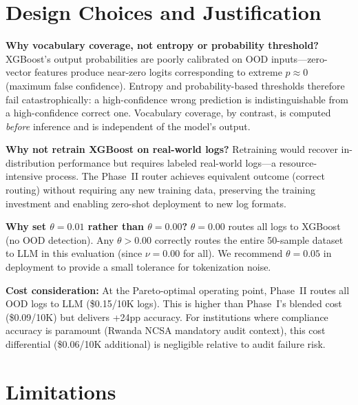 \documentclass[11pt,conference]{IEEEtran}
\begin{document}
\section{Design Choices and Justification}

\textbf{Why vocabulary coverage, not entropy or probability threshold?}
XGBoost's output probabilities are poorly calibrated on OOD inputs---zero-vector
features produce near-zero logits corresponding to extreme $p \approx 0$
(maximum false confidence). Entropy and probability-based thresholds therefore
fail catastrophically: a high-confidence wrong prediction is indistinguishable
from a high-confidence correct one. Vocabulary coverage, by contrast, is
computed \emph{before} inference and is independent of the model's output.

\textbf{Why not retrain XGBoost on real-world logs?}
Retraining would recover in-distribution performance but requires labeled
real-world logs---a resource-intensive process. The Phase~II router achieves
equivalent outcome (correct routing) without requiring any new training data,
preserving the training investment and enabling zero-shot deployment to new
log formats.

\textbf{Why set $\theta = 0.01$ rather than $\theta = 0.00$?}
$\theta = 0.00$ routes all logs to XGBoost (no OOD detection). Any $\theta >
0.00$ correctly routes the entire 50-sample dataset to LLM in this evaluation
(since $\nu = 0.00$ for all). We recommend $\theta = 0.05$ in deployment to
provide a small tolerance for tokenization noise.

\textbf{Cost consideration:}
At the Pareto-optimal operating point, Phase~II routes all OOD logs to LLM
(\$0.15/10K logs). This is higher than Phase~I's blended cost (\$0.09/10K)
but delivers +24pp accuracy. For institutions where compliance accuracy is
paramount (Rwanda NCSA mandatory audit context), this cost differential
(\$0.06/10K additional) is negligible relative to audit failure risk.

\section{Limitations}
\end{document}
